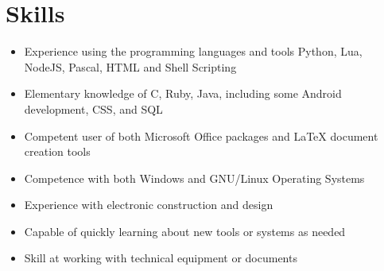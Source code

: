 \documentclass[12pt,a4paper,notitlepage]{article}
\begin{document}
\section*{Skills}
\begin{itemize}
\item Experience using the programming languages and tools Python, Lua, NodeJS, Pascal, HTML and Shell Scripting
\item Elementary knowledge of C, Ruby, Java, including some Android development, CSS, and SQL
\item Competent user of both Microsoft Office packages and LaTeX document creation tools
\item Competence with both Windows and GNU/Linux Operating Systems
\item Experience with electronic construction and design
\item Capable of quickly learning about new tools or systems as needed
\item Skill at working with technical equipment or documents
\end{itemize}
\end{document}
